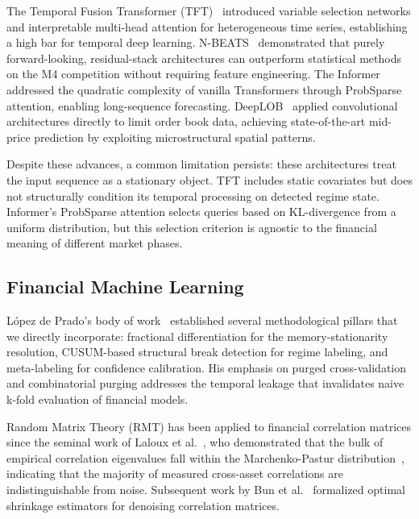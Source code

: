 \documentclass[conference]{IEEEtran}
\begin{document}
The Temporal Fusion Transformer (TFT)~\cite{lim2021temporal} introduced variable selection networks and interpretable multi-head attention for heterogeneous time series, establishing a high bar for temporal deep learning. N-BEATS~\cite{oreshkin2019nbeats} demonstrated that purely forward-looking, residual-stack architectures can outperform statistical methods on the M4 competition without requiring feature engineering. The Informer~\cite{zhou2021informer} addressed the quadratic complexity of vanilla Transformers through ProbSparse attention, enabling long-sequence forecasting. DeepLOB~\cite{zhang2019deeplob} applied convolutional architectures directly to limit order book data, achieving state-of-the-art mid-price prediction by exploiting microstructural spatial patterns.

Despite these advances, a common limitation persists: these architectures treat the input sequence as a stationary object. TFT includes static covariates but does not structurally condition its temporal processing on detected regime state. Informer's ProbSparse attention selects queries based on KL-divergence from a uniform distribution, but this selection criterion is agnostic to the financial meaning of different market phases.

\subsection{Financial Machine Learning}

L\'{o}pez de Prado's body of work~\cite{lopez2018advances} established several methodological pillars that we directly incorporate: fractional differentiation for the memory-stationarity resolution, CUSUM-based structural break detection for regime labeling, and meta-labeling for confidence calibration. His emphasis on purged cross-validation and combinatorial purging addresses the temporal leakage that invalidates naive k-fold evaluation of financial models.

Random Matrix Theory (RMT) has been applied to financial correlation matrices since the seminal work of Laloux et al.~\cite{laloux1999noise}, who demonstrated that the bulk of empirical correlation eigenvalues fall within the Marchenko-Pastur distribution~\cite{marchenko1967distribution}, indicating that the majority of measured cross-asset correlations are indistinguishable from noise. Subsequent work by Bun et al.~\cite{bun2017cleaning} formalized optimal shrinkage estimators for denoising correlation matrices.
\end{document}
